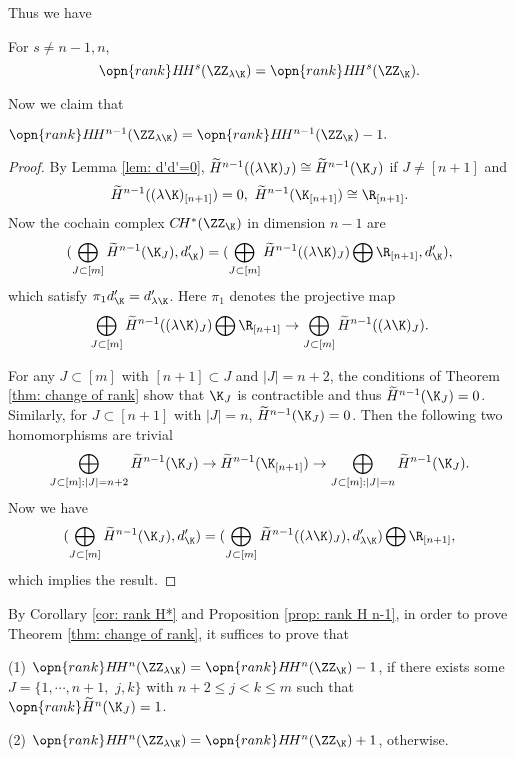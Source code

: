 Thus we have
\begin{cor}
    \label{cor: rank H*}
    For $s\not =n-1,n$,
    $$\opn{rank} H\!H^s(\ZZ_{\lambda\K})=
    \opn{rank} H\!H^s(\ZZ_{\K}).$$
\end{cor}

Now we claim that
\begin{prop}
\label{prop: rank H n-1}
    $\opn{rank} H\!H^{n-1}(\ZZ_{\lambda\K})=
    \opn{rank} H\!H^{n-1}(\ZZ_{\K})-1.$
\end{prop}

\begin{proof}
By Lemma \ref{lem: d'd'=0}, $\widetilde{H}^{n-1}((\lambda\K)_J)
\cong \widetilde{H}^{n-1}(\K_J)$ if $J\not =[n+1]$ and
$$\widetilde{H}^{n-1}((\lambda\K)_{[n+1]})=0,\ 
\widetilde{H}^{n-1}(\K_{[n+1]})\cong\R_{[n+1]}.$$
Now the cochain complex $C\!H^*(\ZZ_{\K})$ in dimension $n-1$ are
$$(\bigoplus_{J\subset [m]}\widetilde{H}^{n-1}(\K_J),d'_{\K})
=(\bigoplus_{J\subset [m]}\widetilde{H}^{n-1}((\lambda\K)_J)\bigoplus \R_{[n+1]},d'_{\K}),$$
which satisfy $\pi_1 d'_{\K}=d'_{\lambda\K}$. Here $\pi_1$ denotes
the projective map 
$$\bigoplus_{J\subset [m]}\widetilde{H}^{n-1}((\lambda
\K)_J)\bigoplus \R_{[n+1]}\to \bigoplus_{J\subset [m]}\widetilde{H}^{n-1}((\lambda\K)_J).$$

For any $J\subset [m]$ with $[n+1]\subset J$ and $|J|=n+2$, the conditions
of Theorem \ref{thm: change of rank} show that $\K_J$ is contractible and thus $\widetilde{H}^{n-1}(\K_J)=0$. Similarly, for $J\subset [n+1]$ with $|J|=n$, $\widetilde{H}^{n-1}(\K_J)=0$. Then the following two homomorphisms
are trivial
$$\bigoplus_{J\subset [m]:|J|=n+2}\widetilde{H}^{n-1}(\K_J)
\to \widetilde{H}^{n-1}(\K_{[n+1]})\to
\bigoplus_{J\subset [m]:|J|=n}\widetilde{H}^{n-1}(\K_J).$$
Now we have
$$(\bigoplus_{J\subset [m]}\widetilde{H}^{n-1}(\K_J),d'_{\K})
=(\bigoplus_{J\subset [m]}\widetilde{H}^{n-1}((\lambda\K)_J),
d'_{\lambda\K})
\bigoplus\R_{[n+1]},$$
which implies the result.
    
\end{proof}

By Corollary \ref{cor: rank H*} and Proposition \ref{prop: rank H n-1}, in
order to prove Theorem \ref{thm: change of rank}, it suffices to prove that
\begin{prop}
    \label{prop: rank H n}
(1) $\opn{rank} H\!H^n(\ZZ_{\lambda\K})=\opn{rank} H\!H^n
(\ZZ_{\K})-1$, if there exists some $J=\{1,\cdots,n+1,$ $j,k\}$ with $n+2\le j<k\le m$ such that $\opn{rank} \widetilde{H}^n(\K_J)=1$.
    
(2) $\opn{rank} H\!H^n(\ZZ_{\lambda\K})=\opn{rank} H\!H^n
(\ZZ_{\K})+1$, otherwise.
\end{prop}

